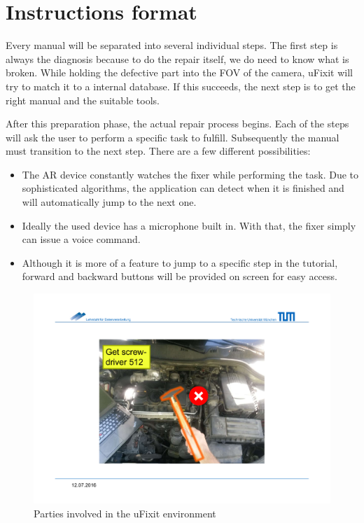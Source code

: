 	\section{Instructions format}
	
		Every manual will be separated into several individual steps. The first step is always the diagnosis because to do the repair itself, we do need to know what is broken. While holding the defective part into the FOV of the camera, uFixit will try to match it to a internal database. If this succeeds, the next step is to get the right manual and the suitable tools.
		
		
		After this preparation phase, the actual repair process begins. Each of the steps will ask the user to perform a specific task to fulfill. Subsequently the manual must transition to the next step. There are a few different possibilities:
		
		\begin{itemize}
			\itemsep0em
			\item The AR device constantly watches the fixer while performing the task. Due to sophisticated algorithms, the application can detect when it is finished and will automatically jump to the next one.
			\item Ideally the used device has a microphone built in. With that, the fixer simply can issue a voice command.
			\item Although it is more of a feature to jump to a specific step in the tutorial, forward and backward buttons will be provided on screen for easy access.
		\end{itemize}
		
		\begin{figure}[H]
			\includegraphics[width=\textwidth, trim=4cm 3cm 4cm 4cm, clip]{../images/instr-hammer.pdf}
			\centering
			\caption{Parties involved in the uFixit environment}
			\label{fig:instr-hammer}
		\end{figure}
		
